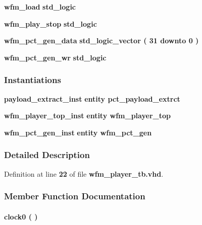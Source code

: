 \begin{DoxyCompactItemize}
\item 
{\bf wfm\+\_\+load} {\bfseries \textcolor{comment}{std\+\_\+logic}\textcolor{vhdlchar}{ }} 
\item 
{\bf wfm\+\_\+play\+\_\+stop} {\bfseries \textcolor{comment}{std\+\_\+logic}\textcolor{vhdlchar}{ }} 
\item 
{\bf wfm\+\_\+pct\+\_\+gen\+\_\+data} {\bfseries \textcolor{comment}{std\+\_\+logic\+\_\+vector}\textcolor{vhdlchar}{ }\textcolor{vhdlchar}{(}\textcolor{vhdlchar}{ }\textcolor{vhdlchar}{ } \textcolor{vhdldigit}{31} \textcolor{vhdlchar}{ }\textcolor{keywordflow}{downto}\textcolor{vhdlchar}{ }\textcolor{vhdlchar}{ } \textcolor{vhdldigit}{0} \textcolor{vhdlchar}{ }\textcolor{vhdlchar}{)}\textcolor{vhdlchar}{ }} 
\item 
{\bf wfm\+\_\+pct\+\_\+gen\+\_\+wr} {\bfseries \textcolor{comment}{std\+\_\+logic}\textcolor{vhdlchar}{ }} 
\end{DoxyCompactItemize}
\subsubsection*{Instantiations}
 \begin{DoxyCompactItemize}
\item 
{\bf payload\+\_\+extract\+\_\+inst}  {\bfseries entity pct\+\_\+payload\+\_\+extrct}   
\item 
{\bf wfm\+\_\+player\+\_\+top\+\_\+inst}  {\bfseries entity wfm\+\_\+player\+\_\+top}   
\item 
{\bf wfm\+\_\+pct\+\_\+gen\+\_\+inst}  {\bfseries entity wfm\+\_\+pct\+\_\+gen}   
\end{DoxyCompactItemize}


\subsubsection{Detailed Description}


Definition at line {\bf 22} of file {\bf wfm\+\_\+player\+\_\+tb.\+vhd}.



\subsubsection{Member Function Documentation}
\paragraph[{clock0}]{\setlength{\rightskip}{0pt plus 5cm} {\bfseries \textcolor{vhdlchar}{ }} clock0 ( ) \hspace{0.3cm}{\ttfamily [Process]}}\label{classwfm__player__tb_1_1tb__behave_a0ffcf9b3fa89917ed2b73a96f170b7ae}


